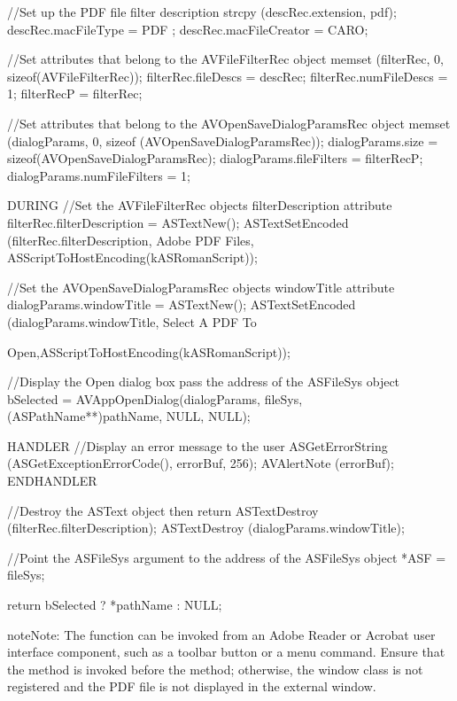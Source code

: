 \documentclass[letterpaper,12pt,english,openany,oneside]{sphinxmanual}
\begin{document}
\begin{sphinxVerbatim}[commandchars=\\\{\}]
//Set up the PDF file filter description
   strcpy (descRec.extension, \PYGZdq{}pdf\PYGZdq{});
   descRec.macFileType = \PYGZsq{}PDF \PYGZsq{};
   descRec.macFileCreator = \PYGZsq{}CARO\PYGZsq{};

//Set attributes that belong to the AVFileFilterRec object
   memset (\PYGZam{}filterRec, 0, sizeof(AVFileFilterRec));
   filterRec.fileDescs = \PYGZam{}descRec;
   filterRec.numFileDescs = 1;
   filterRecP = \PYGZam{}filterRec;

//Set attributes that belong to the AVOpenSaveDialogParamsRec object
   memset (\PYGZam{}dialogParams, 0, sizeof (AVOpenSaveDialogParamsRec));
   dialogParams.size = sizeof(AVOpenSaveDialogParamsRec);
   dialogParams.fileFilters = \PYGZam{}filterRecP;
   dialogParams.numFileFilters = 1;

   DURING
//Set the AVFileFilterRec object\PYGZsq{}s filterDescription attribute
   filterRec.filterDescription = ASTextNew();
   ASTextSetEncoded (filterRec.filterDescription, \PYGZdq{}Adobe PDF Files\PYGZdq{},
   ASScriptToHostEncoding(kASRomanScript));

//Set the AVOpenSaveDialogParamsRec object\PYGZsq{}s windowTitle attribute
   dialogParams.windowTitle = ASTextNew();
   ASTextSetEncoded (dialogParams.windowTitle, \PYGZdq{}Select A PDF To

   Open\PYGZdq{},ASScriptToHostEncoding(kASRomanScript));

//Display the Open dialog box \PYGZhy{} pass the address of the ASFileSys object
   bSelected = AVAppOpenDialog(\PYGZam{}dialogParams, \PYGZam{}fileSys, (ASPathName**)\PYGZam{}pathName, NULL, NULL);

   HANDLER
//Display an error message to the user
   ASGetErrorString (ASGetExceptionErrorCode(), errorBuf, 256);
   AVAlertNote (errorBuf);
   END\PYGZus{}HANDLER

//Destroy the ASText object then return
   ASTextDestroy (filterRec.filterDescription);
   ASTextDestroy (dialogParams.windowTitle);

//Point the ASFileSys argument to the address of the ASFileSys object
   *ASF = fileSys;

   return bSelected ? *pathName : NULL;
   \PYGZcb{}
\end{sphinxVerbatim}

\begin{sphinxadmonition}{note}{Note:}
The  function can be invoked from an Adobe Reader or Acrobat user interface component, such as a toolbar button or a menu command. Ensure that the  method is invoked before the  method; otherwise, the window class is not registered and the PDF file is not displayed in the external window.
\end{sphinxadmonition}
\end{document}
